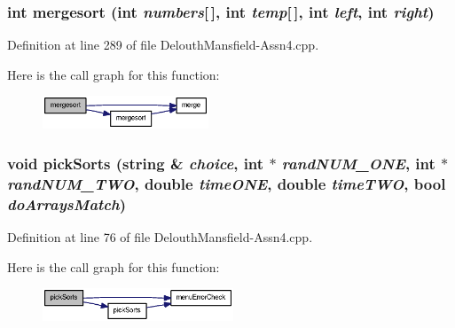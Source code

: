 \hypertarget{_delouth_mansfield-_assn4_8cpp_a5f5d9f539f726c766f4c454c579f2f6d}{
\subsubsection[{mergesort}]{\setlength{\rightskip}{0pt plus 5cm}int mergesort (int {\em numbers}\mbox{[}$\,$\mbox{]}, \/  int {\em temp}\mbox{[}$\,$\mbox{]}, \/  int {\em left}, \/  int {\em right})}}
\label{_delouth_mansfield-_assn4_8cpp_a5f5d9f539f726c766f4c454c579f2f6d}


Definition at line 289 of file DelouthMansfield-\/Assn4.cpp.



Here is the call graph for this function:\nopagebreak
\begin{figure}[H]
\begin{center}
\leavevmode
\includegraphics[width=140pt]{_delouth_mansfield-_assn4_8cpp_a5f5d9f539f726c766f4c454c579f2f6d_cgraph}
\end{center}
\end{figure}


\hypertarget{_delouth_mansfield-_assn4_8cpp_a37091112a4b3fb4a6b3e7e5a395bd888}{
\subsubsection[{pickSorts}]{\setlength{\rightskip}{0pt plus 5cm}void pickSorts (string \& {\em choice}, \/  int $\ast$ {\em randNUM\_\-ONE}, \/  int $\ast$ {\em randNUM\_\-TWO}, \/  double {\em timeONE}, \/  double {\em timeTWO}, \/  bool {\em doArraysMatch})}}
\label{_delouth_mansfield-_assn4_8cpp_a37091112a4b3fb4a6b3e7e5a395bd888}


Definition at line 76 of file DelouthMansfield-\/Assn4.cpp.



Here is the call graph for this function:\nopagebreak
\begin{figure}[H]
\begin{center}
\leavevmode
\includegraphics[width=161pt]{_delouth_mansfield-_assn4_8cpp_a37091112a4b3fb4a6b3e7e5a395bd888_cgraph}
\end{center}
\end{figure}


